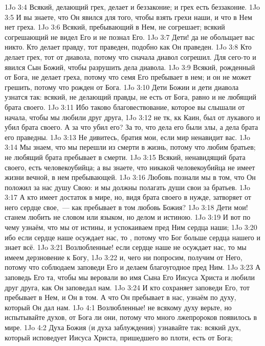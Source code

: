 \vs 1Jo 3:4 Всякий, делающий грех, делает и беззаконие; и грех есть беззаконие.
\vs 1Jo 3:5 И вы знаете, что Он явился для того, чтобы взять грехи наши, и что в Нем нет греха.
\vs 1Jo 3:6 Всякий, пребывающий в Нем, не согрешает; всякий согрешающий не видел Его и не познал Его.
\rsbpar\vs 1Jo 3:7 Дети! да не обольщает вас никто. Кто делает правду, тот праведен, подобно как Он праведен.
\vs 1Jo 3:8 Кто делает грех, тот от диавола, потому что сначала диавол согрешил. Для сего-то и явился Сын Божий, чтобы разрушить дела диавола.
\vs 1Jo 3:9 Всякий, рожденный от Бога, не делает греха, потому что семя Его пребывает в нем; и он не может грешить, потому что рожден от Бога.
\vs 1Jo 3:10 Дети Божии и дети диавола узнатся так: всякий, не делающий правды, не есть от Бога, равно и не любящий брата своего.
\vs 1Jo 3:11 Ибо таково благовествование, которое вы слышали от начала, чтобы мы любили друг друга,
\vs 1Jo 3:12 не тк, кк Каин,  был от лукавого и убил брата своего. А за что убил его? За то, что дела его были злы, а дела брата его праведны.
\vs 1Jo 3:13 Не дивитесь, братия мои, если мир ненавидит вас.
\vs 1Jo 3:14 Мы знаем, что мы перешли из смерти в жизнь, потому что любим братьев; не любящий брата пребывает в смерти.
\vs 1Jo 3:15 Всякий, ненавидящий брата своего, есть человекоубийца; а вы знаете, что никакой человекоубийца не имеет жизни вечной, в нем пребывающей.
\vs 1Jo 3:16 Любовь познали мы в том, что Он положил за нас душу Свою: и мы должны полагать души свои за братьев.
\vs 1Jo 3:17 А кто имеет достаток в мире, но, видя брата своего в нужде, затворяет от него сердце свое,~--- как пребывает в том любовь Божия?
\rsbpar\vs 1Jo 3:18 Дети мои! станем любить не словом или языком, но делом и истиною.
\vs 1Jo 3:19 И вот по чему узнаём, что мы от истины, и успокаиваем пред Ним сердца наши;
\vs 1Jo 3:20 ибо если сердце наше осуждает нас, то , потому что Бог больше сердца нашего и знает всё.
\vs 1Jo 3:21 Возлюбленные! если сердце наше не осуждает нас, то мы имеем дерзновение к Богу,
\vs 1Jo 3:22 и, чего ни попросим, получим от Него, потому что соблюдаем заповеди Его и делаем благоугодное пред Ним.
\vs 1Jo 3:23 А заповедь Его та, чтобы мы веровали во имя Сына Его Иисуса Христа и любили друг друга, как Он заповедал нам.
\vs 1Jo 3:24 И кто сохраняет заповеди Его, тот пребывает в Нем, и Он в том. А что Он пребывает в нас, узнаём по духу, который Он дал нам.
\vs 1Jo 4:1 Возлюбленные! не всякому духу верьте, но испытывайте духов, от Бога ли они, потому что много лжепророков появилось в мире.
\vs 1Jo 4:2 Духа Божия (и духа заблуждения) узнавайте так: всякий дух, который исповедует Иисуса Христа, пришедшего во плоти, есть от Бога;
